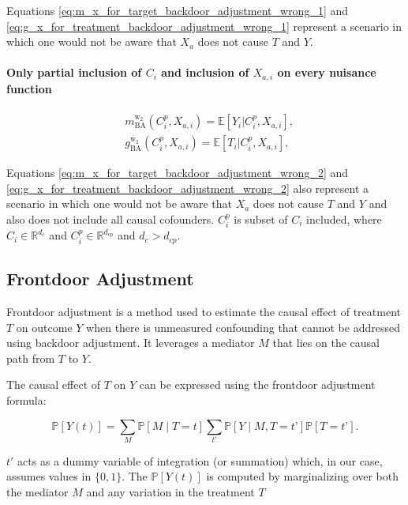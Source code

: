 \documentclass{article}
\numberwithin{equation}{section}
\begin{document}
Equations \eqref{eq:m_x_for_target_backdoor_adjustment_wrong_1} and \eqref{eq:g_x_for_treatment_backdoor_adjustment_wrong_1} represent a scenario in which one would not be aware that $X_a$ does not cause $T$ and $Y$.

\paragraph{Only partial inclusion of $C_i$ and inclusion of $X_{a, i}$ on every nuisance function}
\label{par:backdoor_adjustment_wrong_2}

\begin{align}
    & m_{\text{BA}}^{\text{w}_2}(C^{p}_i, X_{a, i}) = \mathbb{E}[Y_i | C^{p}_i, X_{a, i}],
    \label{eq:m_x_for_target_backdoor_adjustment_wrong_2}
    \\
    & g_{\text{BA}}^{\text{w}_2}(C^{p}_i, X_{a, i}) = \mathbb{E}[T_i | C^{p}_i, X_{a, i}],
    \label{eq:g_x_for_treatment_backdoor_adjustment_wrong_2}
\end{align}

Equations \eqref{eq:m_x_for_target_backdoor_adjustment_wrong_2} and \eqref{eq:g_x_for_treatment_backdoor_adjustment_wrong_2} also represent a scenario in which one would not be aware that $X_a$ does not cause $T$ and $Y$ and also does not include all causal cofounders. $C^{p}_i$ is subset of $C_i$ included, where $C_i \in \mathbb{R}^{d_c}$ and $C^{p}_i \in \mathbb{R}^{d_{cp}}$ and $d_c > d_{cp}$.

\subsection{Frontdoor Adjustment}

Frontdoor adjustment is a method used to estimate the causal effect of treatment $T$ on outcome $Y$ when there is unmeasured confounding that cannot be addressed using backdoor adjustment. It leverages a mediator $M$ that lies on the causal path from $T$ to $Y$.

The causal effect of $T$ on $Y$ can be expressed using the frontdoor adjustment formula:

\begin{equation}
\mathbb{P}[Y(t)] = \sum_M \mathbb{P}[M \mid T=t] \sum_{t’} \mathbb{P}[Y \mid M, T=t’] \mathbb{P}[T=t’].
\end{equation}

$t'$ acts as a dummy variable of integration (or summation) which, in our case, assumes values in $\{0, 1\}$. The $\mathbb{P}[Y(t)]$ is computed by marginalizing over both the mediator $M$ and any variation in the treatment $T$ \cite{Pearl2012}
\end{document}
